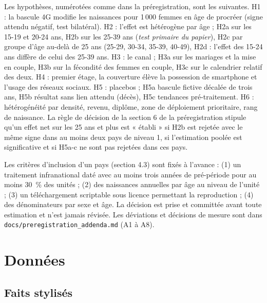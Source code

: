 \documentclass[11pt,a4paper]{article}
\begin{document}
Les hypothèses, numérotées comme dans la préregistration, sont les suivantes. H1 : la bascule 4G modifie les naissances pour 1\,000 femmes en âge de procréer (signe attendu négatif, test bilatéral). H2 : l'effet est hétérogène par âge ; H2a sur les 15-19 et 20-24 ans, H2b sur les 25-39 ans (\emph{test primaire du papier}), H2c par groupe d'âge au-delà de 25 ans (25-29, 30-34, 35-39, 40-49), H2d : l'effet des 15-24 ans diffère de celui des 25-39 ans. H3 : le canal ; H3a sur les mariages et la mise en couple, H3b sur la fécondité des femmes en couple, H3c sur le calendrier relatif des deux. H4 : premier étage, la couverture élève la possession de smartphone et l'usage des réseaux sociaux. H5 : placebos ; H5a bascule fictive décalée de trois ans, H5b résultat sans lien attendu (décès), H5c tendances pré-traitement. H6 : hétérogénéité par densité, revenu, diplôme, zone de déploiement prioritaire, rang de naissance. La règle de décision de la section 6 de la préregistration stipule qu'un effet net sur les 25 ans et plus est « établi » si H2b est rejetée avec le même signe dans au moins deux pays de niveau 1, si l'estimation poolée est significative et si H5a-c ne sont pas rejetées dans ces pays.

Les critères d'inclusion d'un pays (section 4.3) sont fixés à l'avance : (1) un traitement infranational daté avec au moins trois années de pré-période pour au moins 30~\% des unités ; (2) des naissances annuelles par âge au niveau de l'unité ; (3) un téléchargement scriptable sous licence permettant la reproduction ; (4) des dénominateurs par sexe et âge. La décision est prise et committée avant toute estimation et n'est jamais révisée. Les déviations et décisions de mesure sont dans \texttt{docs/preregistration\_addenda.md} (A1 à A8).

\section{Données}

\subsection{Faits stylisés}
\end{document}
